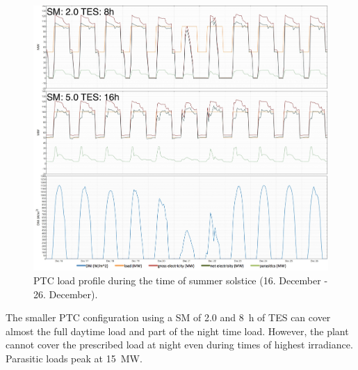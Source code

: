 \begin{figure}[htbp]  
\centering
\includegraphics[width=1\linewidth]{FIG/PTC_summer_load}
\caption[PTC load profile during the time of summer solstice (16. December - 26. December).]{PTC load profile during the time of summer solstice (16. December - 26. December).}\label{PTC_summer_load}
\end{figure}

The smaller PTC configuration using a SM of \num{2.0} and \SI{8}{h} of TES can cover almost the full daytime load and part of the night time load. However, the plant cannot cover the prescribed load at night even during times of highest irradiance. Parasitic loads peak at \SI{15}{MW}. 


